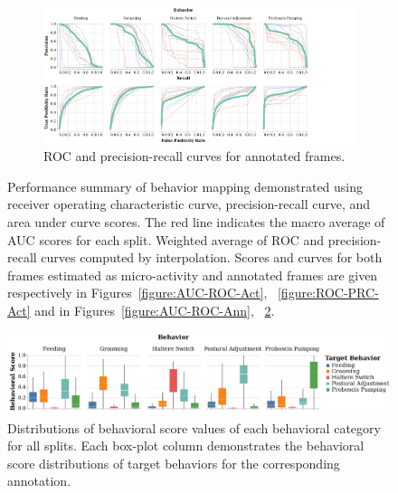 \begin{figure}[htb!]
	\begin{subfigure}[ht!]{0.95\linewidth}
		\centering\includegraphics[width=\linewidth]{figures/PRC_ROC-DAnnfiltered.pdf}
		\caption{ROC and precision-recall curves for annotated frames. \label{figure:ROC-PRC-Ann}}
	\end{subfigure}%
	\caption[Performance summary of behavior mapping demonstrated using receiver operating characteristic curve, precision-recall curve, and area under curve scores.
	]{Performance summary of behavior mapping demonstrated using receiver operating characteristic curve, precision-recall curve, and area under curve scores.
		The red line indicates the macro average of AUC scores for each split.
		Weighted average of ROC and precision-recall curves computed by interpolation.
		Scores and curves for both frames estimated as micro-activity and annotated frames are given respectively in Figures~\ref{figure:AUC-ROC-Act}, ~\ref{figure:ROC-PRC-Act} and in Figures~\ref{figure:AUC-ROC-Ann}, ~\ref{figure:ROC-PRC-Ann}.}
\end{figure}

\begin{figure}[ht!]
	\centering
	\includegraphics[width=\linewidth]{figures/BehavioralScoresDistributions_perBehavior.pdf}
	\caption[Distributions of behavioral score values of each behavioral category for all splits.]{Distributions of behavioral score values of each behavioral category for all splits.
		Each box-plot column demonstrates the behavioral score distributions of target behaviors for the corresponding annotation.}
\end{figure}


